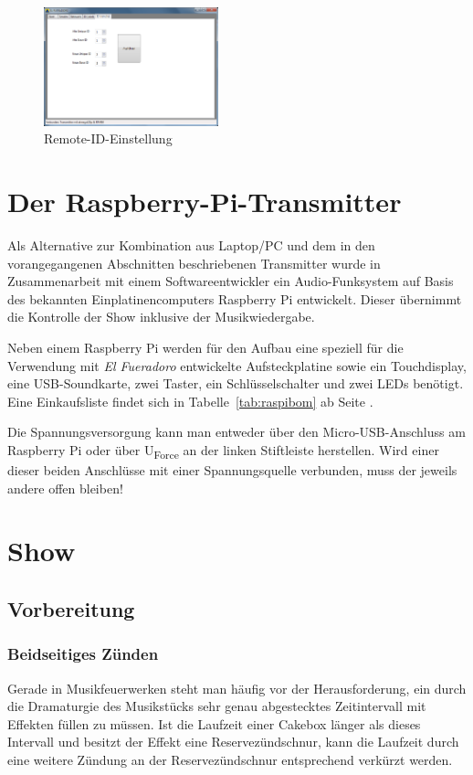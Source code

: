 \documentclass[paper=a4, parskip, numbers=noenddot, toc=listof, headsepline]{scrbook}
\newcommand{\anlage}{\emph{El Fueradoro}}
\begin{document}
		  \begin{figure}[!t]
			  \centering
			  \includegraphics[width=0.45\textwidth]{bilder/gui-remote}
			  \caption{Remote-ID-Einstellung}
			  \label{fig:gui-remote}
		  \end{figure}

		\chapter{Der Raspberry-Pi-Transmitter}

		 Als Alternative zur Kombination aus Laptop/PC und dem in den vorangegangenen Abschnitten beschriebenen Transmitter wurde in Zusammenarbeit mit einem Softwareentwickler ein Audio-Funksystem auf Basis des bekannten Einplatinencomputers Raspberry Pi entwickelt. Dieser übernimmt die Kontrolle der Show inklusive der Musikwiedergabe.

		 Neben einem Raspberry Pi werden für den Aufbau eine speziell für die Verwendung mit {\anlage} entwickelte Aufsteckplatine sowie ein Touchdisplay, eine USB-Soundkarte, zwei Taster, ein Schlüsselschalter und zwei LEDs benötigt. Eine Einkaufsliste findet sich in Tabelle~\ref{tab:raspibom} ab Seite \pageref{tab:raspibom}.

		 Die Spannungsversorgung kann man entweder über den Micro-USB-Anschluss am Raspberry Pi oder über U\textsubscript{Force} an der linken Stiftleiste herstellen. Wird einer dieser beiden Anschlüsse mit einer Spannungsquelle verbunden, muss der jeweils andere offen bleiben!

		\chapter{Show}

		 \section{Vorbereitung}

		  \subsection{Beidseitiges Zünden}
			  Gerade in Musikfeuerwerken steht man häufig vor der Herausforderung, ein durch die Dramaturgie des Musikstücks sehr genau abgestecktes Zeitintervall mit Effekten füllen zu müssen. Ist die Laufzeit einer Cakebox länger als dieses Intervall und besitzt der Effekt eine Reservezündschnur, kann die Laufzeit durch eine weitere Zündung an der Reservezündschnur entsprechend verkürzt werden.
\end{document}
